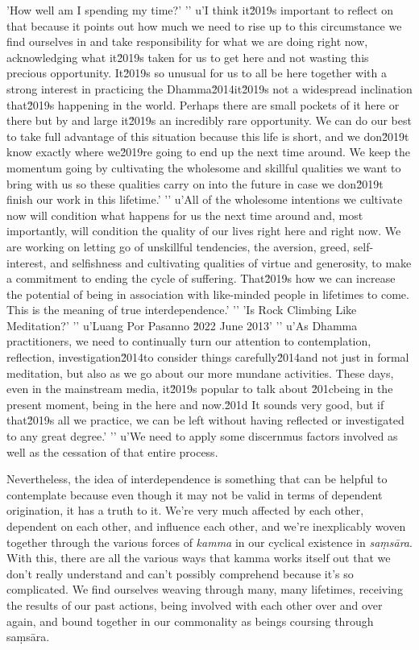 'How well am I spending my time?'
'\n'
u'I think it\u2019s important to reflect on that because it points out how much we need to rise up to this circumstance we find ourselves in and take responsibility for what we are doing right now, acknowledging what it\u2019s taken for us to get here and not wasting this precious opportunity. It\u2019s so unusual for us to all be here together with a strong interest in practicing the Dhamma\u2014it\u2019s not a widespread inclination that\u2019s happening in the world. Perhaps there are small pockets of it here or there but by and large it\u2019s an incredibly rare opportunity. We can do our best to take full advantage of this situation because this life is short, and we don\u2019t know exactly where we\u2019re going to end up the next time around. We keep the momentum going by cultivating the wholesome and skillful qualities we want to bring with us so these qualities carry on into the future in case we don\u2019t finish our work in this lifetime.'
'\n'
u'All of the wholesome intentions we cultivate now will condition what happens for us the next time around and, most importantly, will condition the quality of our lives right here and right now. We are working on letting go of unskillful tendencies, the aversion, greed, self-interest, and selfishness and cultivating qualities of virtue and generosity, to make a commitment to ending the cycle of suffering. That\u2019s how we can increase the potential of being in association with like-minded people in lifetimes to come. This is the meaning of true interdependence.'
'\n'
'Is Rock Climbing Like Meditation?'
'\n'
u'Luang Por Pasanno \u2022 June 2013'
'\n'
u'As Dhamma practitioners, we need to continually turn our attention to contemplation, reflection, investigation\u2014to consider things carefully\u2014and not just in formal meditation, but also as we go about our more mundane activities. These days, even in the mainstream media, it\u2019s popular to talk about \u201cbeing in the present moment, being in the here and now.\u201d It sounds very good, but if that\u2019s all we practice, we can be left without having reflected or investigated to any great degree.'
'\n'
u'We need to apply some discernmus factors involved as well as the cessation of that 
entire process.

Nevertheless, the idea of interdependence is something that can be 
helpful to contemplate because even though it may not be valid in terms 
of dependent origination, it has a truth to it. We're very much 
affected by each other, dependent on each other, and influence each 
other, and we're inexplicably woven together through the various forces 
of \emph{kamma} in our cyclical existence in \emph{saṃsāra}. With 
this, there are all the various ways that kamma works itself out that 
we don't really understand and can't possibly comprehend because it's 
so complicated. We find ourselves weaving through many, many lifetimes, 
receiving the results of our past actions, being involved with each 
other over and over again, and bound together in our commonality as 
beings coursing through saṃsāra.

